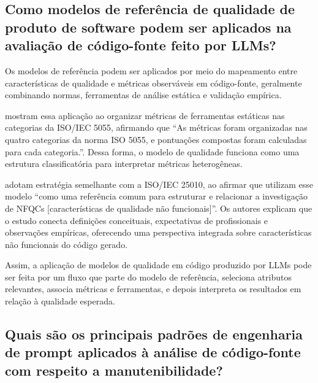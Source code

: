 \subsection{Como modelos de referência de qualidade de produto de software podem ser aplicados na avaliação de código-fonte feito por LLMs?}

Os modelos de referência podem ser aplicados por meio do mapeamento entre características de qualidade e métricas observáveis em código-fonte, geralmente combinando normas, ferramentas de análise estática e validação empírica.

 mostram essa aplicação ao organizar métricas de ferramentas estáticas nas categorias da ISO/IEC 5055, afirmando que “As métricas foram organizadas nas quatro categorias da norma ISO 5055, e pontuações compostas foram calculadas para cada categoria.”. Dessa forma, o modelo de qualidade funciona como uma estrutura classificatória para interpretar métricas heterogêneas.

 adotam estratégia semelhante com a ISO/IEC 25010, ao afirmar que utilizam esse modelo “como uma referência comum para estruturar e relacionar a investigação de NFQCs [características de qualidade não funcionais]”. Os autores explicam que o estudo conecta definições conceituais, expectativas de profissionais e observações empíricas, oferecendo uma perspectiva integrada sobre características não funcionais do código gerado.

Assim, a aplicação de modelos de qualidade em código produzido por LLMs pode ser feita por um fluxo que parte do modelo de referência, seleciona atributos relevantes, associa métricas e ferramentas, e depois interpreta os resultados em relação à qualidade esperada. 

\subsection{Quais são os principais padrões de engenharia de prompt aplicados à análise de código-fonte com respeito a manutenibilidade?}


